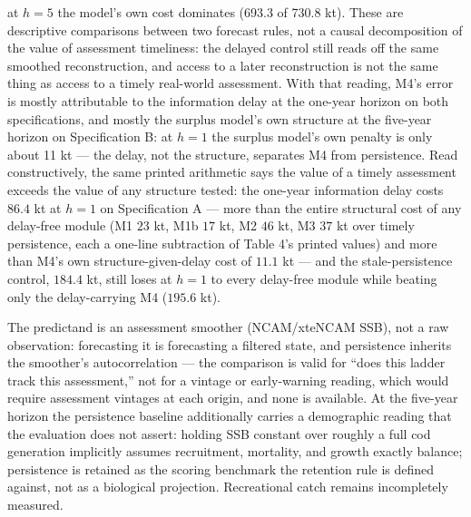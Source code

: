 \documentclass[11pt]{article}
\begin{document}
at \(h = 5\) the model's own cost dominates (693.3 of 730.8 kt). These are descriptive comparisons between two
forecast rules, not a causal decomposition of the value of assessment
timeliness: the delayed control still reads off the same smoothed
reconstruction, and access to a later reconstruction is not the same
thing as access to a timely real-world assessment. With that reading,
M4's error is mostly attributable to the information delay at the
one-year horizon on both specifications, and mostly the surplus model's own structure at the
five-year horizon on Specification B: at \(h = 1\) the surplus model's
own penalty is only about 11 kt --- the delay, not the structure,
separates M4 from persistence. Read constructively, the same printed
arithmetic says the value of a timely assessment exceeds the value of
any structure tested: the one-year information delay costs \(86.4\) kt
at \(h = 1\) on Specification A --- more than the entire structural cost
of any delay-free module (M1 \(23\) kt, M1b \(17\) kt, M2 \(46\) kt, M3
\(37\) kt over timely persistence, each a one-line subtraction of Table
4's printed values) and more than M4's own structure-given-delay cost of
\(11.1\) kt --- and the stale-persistence control, \(184.4\) kt, still
loses at \(h = 1\) to every delay-free module while beating only the
delay-carrying M4 (\(195.6\) kt).

The predictand is an assessment smoother (NCAM/xteNCAM SSB), not a raw
observation: forecasting it is forecasting a filtered state, and
persistence inherits the smoother's autocorrelation --- the comparison
is valid for ``does this ladder track this assessment,'' not for a
vintage or early-warning reading, which would require assessment
vintages at each origin, and none is available. At the five-year horizon
the persistence baseline additionally carries a demographic reading that
the evaluation does not assert: holding SSB constant over roughly a full
cod generation implicitly assumes recruitment, mortality, and growth
exactly balance; persistence is retained as the scoring benchmark the
retention rule is defined against, not as a biological projection.
Recreational catch remains incompletely measured.
\end{document}
